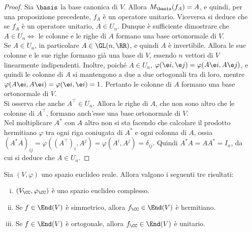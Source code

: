 \begin{proof}
	Sia $\basis$ la base canonica di $V$. Allora $M_\basis(f_A) = A$, e quindi, per una proposizione
	precedente, $f_A$ è un operatore unitario. Viceversa si deduce che se $f_A$ è un operatore unitario,
	$A \in U_n$. Dunque è sufficiente dimostrare che $A \in U_n \iff$ le colonne e le righe di $A$ formano una
	base ortonormale di $V$. \\
	
	\rightproof Se $A \in U_n$, in particolare $A \in \GL(n, \RR)$, e quindi $A$ è invertibile. Allora le
	sue colonne e le sue righe formano già una base di $V$, essendo $n$ vettori di $V$ linearmente indipendenti.
	Inoltre, poiché $A \in U_n$, $\varphi(\e i, \e j) = \varphi(A \e i, A \e j)$, e quindi le colonne di $A$ si mantengono a due a due ortogonali tra di loro, mentre $\varphi(A \e i, A \e i) = \varphi(\e i, \e i) = 1$.
	Pertanto le colonne di $A$ formano una base ortonormale di $V$. \\
	
	Si osserva che anche $A^\top \in U_n$. Allora le righe di $A$, che non sono altro che
	le colonne di $A^\top$, formano anch'esse una base ortonormale di $V$. \\
	
	\leftproof Nel moltiplicare $A^*$ con $A$ altro non si sta facendo che calcolare il prodotto
	hermitiano $\varphi$ tra ogni riga coniugata di $A^*$ e ogni colonna di $A$, ossia $(A^* A)_{ij} = \varphi((A^\top)_i, A^j) = \varphi(A^i, A^j) = \delta_{ij}$.
	Quindi $A^* A = A A^* = I_n$, da cui si deduce che $A \in U_n$.
\end{proof}

\begin{proposition}
	Sia $(V, \varphi)$ uno spazio euclideo reale. Allora valgono i seguenti tre risultati:
	
	\begin{enumerate}[(i)]
		\item $(V_\CC, \varphi_\CC)$ è uno spazio euclideo complesso.
		
		\item Se $f \in \End(V)$ è simmetrico, allora $f_\CC \in \End(V)$ è hermitiano.
		
		\item Se $f \in \End(V)$ è ortogonale, allora $f_\CC \in \End(V)$ è unitario.
	\end{enumerate}
\end{proposition}

